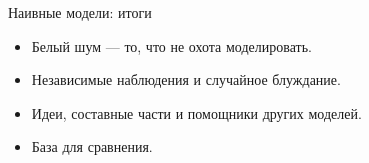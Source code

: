 \begin{frame}{Наивные модели: итоги}

  \begin{itemize}[<+->]
    \item Белый шум — то, что не охота моделировать. 
    \item Независимые наблюдения и случайное блуждание.
    \item Идеи, составные части и помощники других моделей.
    \item База для сравнения.
  \end{itemize}
\end{frame}

